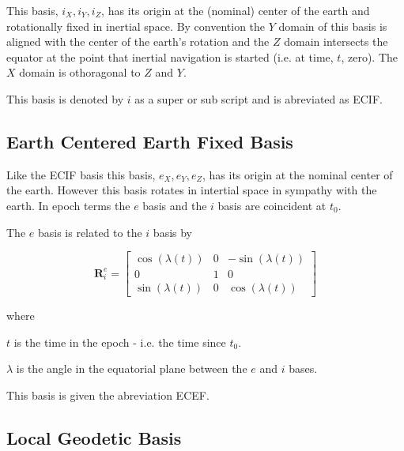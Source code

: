 \documentclass[a4paper]{report}
\numberwithin{equation}{chapter}
\newcommand{\mat}[1]{\boldsymbol{#1}}
\begin{document}
\bigskip

This basis, $i_X, i_Y, i_Z$, has its origin at the (nominal) center of the earth and rotationally fixed in inertial space. By convention the $Y$ domain of this basis is aligned with the center of the earth's rotation and the $Z$ domain intersects the equator at the point that inertial navigation is started (i.e. at time, $t$, zero). The $X$ domain is othoragonal to $Z$ and $Y$.

This basis is denoted by $i$ as a super or sub script and is abreviated as ECIF.

\bigskip

\subsection[Earth Centered Earth Fixed Basis]{Earth Centered Earth Fixed Basis}

\bigskip

Like the ECIF basis this basis, $e_X, e_Y, e_Z$, has its origin at the nominal center of the earth. However this basis rotates in intertial space in sympathy with the earth. In epoch terms the $e$ basis and the $i$ basis are coincident at $t_0$.

\bigskip

The $e$ basis is related to the $i$ basis by

\bigskip

\begin{equation}
\mat{R}^e_i =
\begin{bmatrix}
\cos \left( \lambda \left( t \right) \right) & 0 & -\sin \left( \lambda \left( t \right) \right) \\
0 & 1 & 0 \\
\sin \left( \lambda \left( t \right) \right) & 0 & \cos \left( \lambda \left( t \right) \right)

\end{bmatrix}
\end{equation}

\bigskip

where

$t$ is the time in the epoch - i.e. the time since $t_0$.

$\lambda$ is the angle in the equatorial plane between the $e$ and $i$ bases.

\bigskip

This basis is given the abreviation ECEF.

\subsection[Local Geodetic Basis]{Local Geodetic Basis}
\end{document}
